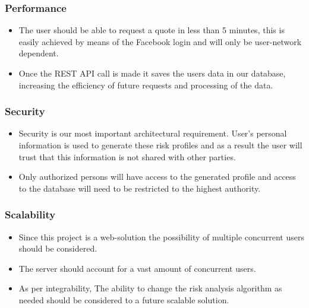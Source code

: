\documentclass{article}
\begin{document}
		\subsubsection{Performance}
		\begin{itemize}
			\item The user should be able to request a quote in less than 5 minutes, this is easily achieved by means of the Facebook login and will only be user-network dependent.
			\item Once the REST API call is made it saves the users data in our database, increasing the efficiency of future requests and processing of the data.
		\end{itemize}
		 
		\subsubsection{Security}
		\begin{itemize}
			\item Security is our most important architectural requirement. User's personal information is used to generate these risk profiles and as a result the user will trust that this information is not shared with other parties.
			\item Only authorized persons will have access to the generated profile and access to the database will need to be restricted to the highest authority.
		\end{itemize}
		\subsubsection{Scalability}
		\begin{itemize}
			\item Since this project is a web-solution the possibility of multiple concurrent users should be considered.
			\item The server should account for a vast amount of concurrent users.
			\item As per integrability, The ability to change the risk analysis algorithm as needed should be considered to a future scalable solution.
		\end{itemize}

		
\end{document}
